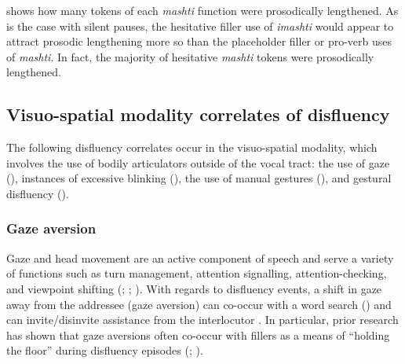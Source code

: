 \documentclass[output=paper]{langscibook}
\begin{document}
 shows how many tokens of each \textit{mashti} function were prosodically lengthened. As is the case with silent pauses, the hesitative filler use of \textit{imashti} would appear to attract prosodic lengthening more so than the placeholder filler or pro-verb uses of \textit{mashti}. In fact, the majority of hesitative \textit{mashti} tokens were prosodically lengthened.


\begin{table}
\caption{\label{tab:rice:10} Occurrence of prosodic lengthening in \textit{mashti} tokens in the corpus}
\end{table}

\subsection{Visuo-spatial modality correlates of disfluency}
\label{sec:rice:4.2}

The following disfluency correlates occur in the visuo-spatial modality, which involves the use of bodily articulators outside of the vocal tract: the use of gaze (), instances of excessive blinking (), the use of manual gestures (), and gestural disfluency ().

\subsubsection{Gaze aversion}
\label{sec:rice:4.2.1}
Gaze and head movement are an active component of speech and serve a variety of functions such as turn management, attention signalling, attention-checking, and viewpoint shifting (\citealt{Rossano2012}; \citealt{Sweetser2016a}; \citealt{Thompson2014}). With regards to disfluency events, a shift in gaze away from the addressee (gaze aversion) can co-occur with a word search (\citealt{Goodwin1986}) and can invite/disinvite assistance from the interlocutor \citep{Hayashi2003body}. In particular, prior research has shown that gaze aversions often co-occur with fillers as a means of “holding the floor” during disfluency episodes (\citealt{Brone2017}; \citealt{Feyaerts2017}).
\end{document}
